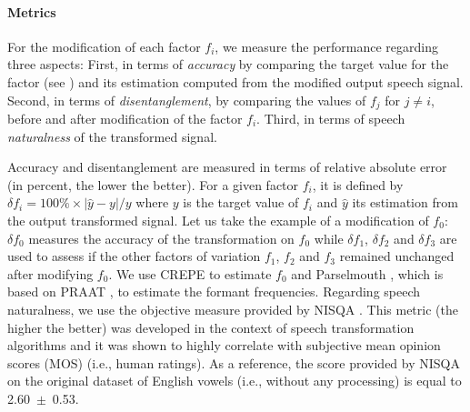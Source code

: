 \documentclass[review]{elsarticle}
\begin{document}
\begin{table}
\centering
{}
\caption{Variation range and step size used for the transformation of each test signal in the English vowels and TIMIT datasets, along each factor of variation.}
\label{tab:test_dataset}
\end{table}


\paragraph{Metrics} For the modification of each factor $f_i$, we measure the performance regarding three aspects: First, in terms of  \textit{accuracy} by comparing the target value for the factor (see ) and its estimation computed from the modified output speech signal. Second, in terms of \textit{disentanglement}, by comparing the values of $f_j$ for $j \neq i$, before and after modification of the factor $f_i$. Third, in terms of speech \textit{naturalness} of the transformed signal. 

Accuracy and disentanglement are measured in terms of relative absolute error (in percent, the lower the better). For a given factor $f_i$, it is defined by $\delta f_{i} = 100\% \times |\hat{y} - y|/y$ where $y$ is the target value of $f_i$ and $\hat{y}$ its estimation from the output transformed signal. Let us take the example of a modification of $f_0$: $\delta f_{0}$ measures the accuracy of the transformation on $f_0$ while $\delta f_{1}$, $\delta f_{2}$ and $\delta f_{3}$ are used to assess if the other factors of variation $f_1$, $f_2$ and $f_3$ remained unchanged after modifying $f_0$. We use CREPE \citep{kim2018crepe} to estimate $f_0$ and Parselmouth \citep{parselmouth}, which is based on PRAAT \citep{praat}, to estimate the formant frequencies. Regarding speech naturalness, we use the objective measure provided by NISQA \citep{mittag2020deep}. This metric (the higher the better) was developed in the context of speech transformation algorithms and it was shown to highly correlate with subjective mean opinion scores (MOS) (i.e., human ratings). As a reference, the score provided by NISQA on the original dataset of English vowels (i.e., without any processing) is equal to 2.60~$\pm$~0.53.
\end{document}
